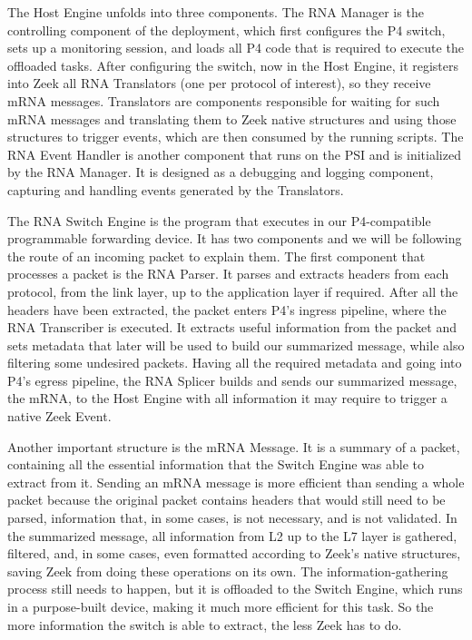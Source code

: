 The Host Engine unfolds into three components. The RNA Manager is the controlling component of the deployment, which first configures the P4 switch, sets up a monitoring session, and loads all P4 code that is required to execute the offloaded tasks. After configuring the switch, now in the Host Engine, it registers into Zeek all RNA Translators (one per protocol of interest), so they receive mRNA messages. Translators are components responsible for waiting for such mRNA messages and translating them to Zeek native structures and using those structures to trigger events, which are then consumed by the running scripts. The RNA Event Handler is another component that runs on the PSI and is initialized by the RNA Manager. It is designed as a debugging and logging component, capturing and handling events generated by the Translators.

The RNA Switch Engine is the program that executes in our P4-compatible programmable forwarding device. It has two components and we will be following the route of an incoming packet to explain them. The first component that processes a packet is the RNA Parser. It parses and extracts headers from each protocol, from the link layer, up to the application layer if required. After all the headers have been extracted, the packet enters P4's ingress pipeline, where the RNA Transcriber is executed. It extracts useful information from the packet and sets metadata that later will be used to build our summarized message, while also filtering some undesired packets. Having all the required metadata and going into P4's egress pipeline, the RNA Splicer builds and sends our summarized message, the mRNA, to the Host Engine with all information it may require to trigger a native Zeek Event.

Another important structure is the mRNA Message. It is a summary of a packet, containing all the essential information that the Switch Engine was able to extract from it. Sending an mRNA message is more efficient than sending a whole packet because the original packet contains headers that would still need to be parsed, information that, in some cases, is not necessary, and is not validated. In the summarized message, all information from L2 up to the L7 layer is gathered, filtered, and, in some cases, even formatted according to Zeek's native structures, saving Zeek from doing these operations on its own. The information-gathering process still needs to happen, but it is offloaded to the Switch Engine, which runs in a purpose-built device, making it much more efficient for this task. So the more information the switch is able to extract, the less Zeek has to do.

